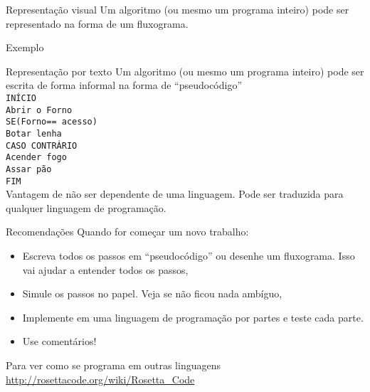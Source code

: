 \documentclass[handout]{beamer}
\begin{document}
\begin{frame}{Representação visual}
Um algoritmo (ou mesmo um programa inteiro) pode ser representado na forma de um fluxograma.\\

\begin{center}
\end{center}
\end{frame}

\begin{frame}{Exemplo}
\begin{center}
\end{center}
\end{frame}

\begin{frame}{Representação por texto}
  Um algoritmo (ou mesmo um programa inteiro) pode ser escrita de forma informal na forma de ``pseudocódigo''\\
\texttt{INÍCIO\\
\hspace{10pt}   Abrir o Forno\\
\hspace{10pt}   SE(Forno== acesso)\\
\hspace{10pt}\hspace{10pt}       Botar lenha\\
\hspace{10pt}   CASO CONTRÁRIO\\
\hspace{10pt}\hspace{10pt}       Acender fogo\\
\hspace{10pt}   Assar pão\\
FIM\\}
Vantagem de não ser dependente de uma linguagem. Pode ser traduzida para qualquer linguagem de programação.
\end{frame}

\begin{frame}{Recomendações}
   Quando for começar um novo trabalho:
  \begin{itemize}[<+->]
  \item Escreva todos os passos em ``pseudocódigo'' ou desenhe um fluxograma. Isso vai ajudar a entender todos os passos,
  \item Simule os passos no papel. Veja se não ficou nada ambíguo,
  \item Implemente em uma  linguagem de programação por partes e teste cada parte.
  \item Use comentários!
  \end{itemize}
  \pause
Para ver como se programa em outras linguagens \url{http://rosettacode.org/wiki/Rosetta_Code}
\end{frame}
\end{document}
